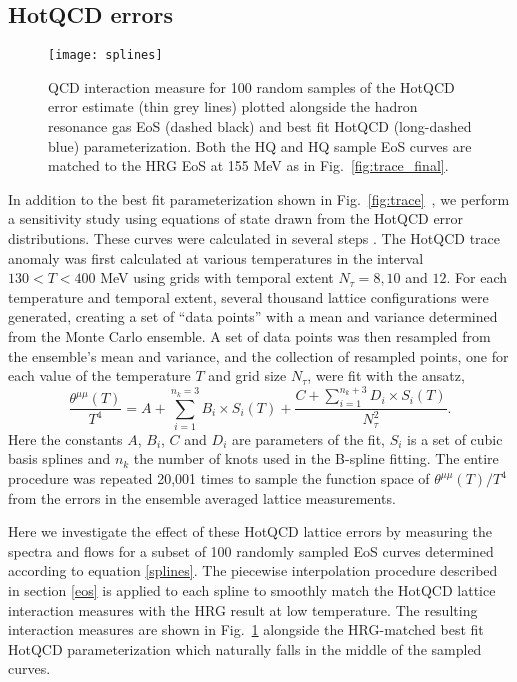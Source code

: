 \documentclass[aps,prc,reprint,amsmath,nofootinbib,superscriptaddress]{revtex4-1}
\begin{document}
\subsection{HotQCD errors}
\label{errors}

\begin{figure}[t]
  \texttt{[image: splines]}
  \caption{
    \label{fig:splines}
    QCD interaction measure for 100 random samples of the HotQCD error estimate (thin grey lines) plotted alongside the hadron resonance gas EoS (dashed black) and 
    best fit HotQCD (long-dashed blue) parameterization. Both the HQ and HQ sample EoS curves are matched to the HRG EoS at 155 MeV as in Fig.~\ref{fig:trace_final}.
  }
\end{figure}

In addition to the best fit parameterization shown in Fig.~\ref{fig:trace}~, we perform a sensitivity study using equations of state drawn from the HotQCD error distributions.  These curves were calculated in several steps \cite{Bazavov:2014pvz}.
The HotQCD trace anomaly was first calculated at various temperatures in the interval $130 < T < 400$ MeV using grids with temporal extent $N_\tau = 8,10$ and $12$.
For each temperature and temporal extent, several thousand lattice configurations were generated, creating a set of ``data points'' with a mean and variance determined from the Monte Carlo ensemble. 
A set of data points was then resampled from the ensemble's mean and variance, and the collection of resampled points, one for each value of the temperature $T$ and grid size $N_\tau$, were fit with the ansatz,
\begin{equation}
 \label{splines}
 \frac{\theta^{\mu\mu}(T)}{T^4} = A + \sum\limits_{i=1}^{n_k=3} B_i \times S_i(T) + \frac{C + \sum_{i=1}^{n_k + 3} D_i \times S_i(T)}{N_\tau^2}.
\end{equation}
Here the constants $A$, $B_i$, $C$ and $D_i$ are parameters of the fit, $S_i$ is a set of cubic basis splines and $n_k$ the number of knots used in the B-spline fitting. 
The entire procedure was repeated 20,001 times to sample the function space of $\theta^{\mu\mu}(T)/T^4$ from the errors in the ensemble averaged lattice measurements.

Here we investigate the effect of these HotQCD lattice errors by measuring the spectra and flows for a subset of 100 randomly sampled EoS curves determined according to equation \eqref{splines}.
The piecewise interpolation procedure described in section \ref{eos} is applied to each spline to smoothly match the HotQCD lattice interaction measures with the HRG result at low temperature. 
The resulting interaction measures are shown in Fig.~\ref{fig:splines} alongside the HRG-matched best fit HotQCD parameterization which naturally falls in the middle of the sampled curves.  
\end{document}
